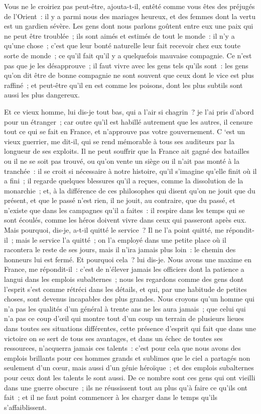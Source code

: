 \documentclass[french,twoside]{book} %
\begin{document}
Vous ne le croiriez pas peut-être, ajouta-t-il, entêté comme vous êtes des préjugés \\
de l’Orient : il y a parmi nous des mariages heureux, et des femmes dont la vertu est un gardien sévère. Les gens dont nous parlons goûtent entre eux une paix qui ne peut être troublée ; ils sont aimés et estimés de tout le monde : il n’y a qu’une chose ; c’est que leur bonté naturelle leur fait recevoir chez eux toute sorte de monde ; ce qu’il fait qu’il y a quelquefois mauvaise compagnie. Ce n’est pas que je les désapprouve ; il faut vivre avec les gens tels qu’ils sont : les gens qu’on dit être de bonne compagnie ne sont souvent que ceux dont le vice est plus raffiné ; et peut-être qu’il en est comme les poisons, dont les plus subtils sont aussi les plus dangereux.\par
Et ce vieux homme, lui dis-je tout bas, qui a l’air si chagrin ? je l’ai pris d’abord pour un étranger ; car outre qu’il est habillé autrement que les autres, il censure tout ce qui se fait en France, et n’approuve pas votre gouvernement. C ‘est un vieux guerrier, me dit-il, qui se rend mémorable à tous ses auditeurs par la longueur de ses exploits. Il ne peut souffrir que la France ait gagné des batailles ou il ne se soit pas trouvé, ou qu’on vente un siège ou il n’ait pas monté à la tranchée : il se croit si nécessaire à notre histoire, qu’il s’imagine qu’elle finit où il a fini ; il regarde quelques blessures qu’il a reçues, comme la dissolution de la monarchie ; et, à la différence de ces philosophes qui disent qu’on ne jouit que du présent, et que le passé n’est rien, il ne jouit, au contraire, que du passé, et n’existe que dans les campagnes qu’il a faites : il respire dans les temps qui se sont écoulés, comme les héros doivent vivre dans ceux qui passeront après eux. Mais pourquoi, dis-je, a-t-il quitté le service ? Il ne l’a point quitté, me répondit-il ; mais le service l’a quitté ; on l’a employé dans une petite place où il racontera le reste de ses jours, mais il n’ira jamais plus loin : le chemin des honneurs lui est fermé. Et pourquoi cela ? lui dis-je. Nous avons une maxime en France, me répondit-il : c’est de n’élever jamais les officiers dont la patience a langui dans les emplois subalternes ; nous les regardons comme des gens dont l’esprit s’est comme rétréci dans les détails, et qui, par une habitude de petites choses, sont devenus incapables des plus grandes. Nous croyons qu’un homme qui n’a pas les qualités d’un général à trente ans ne les aura jamais ; que celui qui n’a pas ce coup d’œil qui montre tout d’un coup un terrain de plusieurs lieues dans toutes ses situations différentes, cette présence d’esprit qui fait que dans une victoire on se sert de tous ses avantages, et dans un échec de toutes ses ressources, n’acquerra jamais ces talents : c’est pour cela que nous avons des emplois brillants pour ces hommes grands et sublimes que le ciel a partagés non seulement d’un cœur, mais aussi d’un génie héroïque ; et des emplois subalternes pour ceux dont les talents le sont aussi. De ce nombre sont ces gens qui ont vieilli dans une guerre obscure ; ils ne réussissent tout au plus qu’à faire ce qu’ils ont fait ; et il ne faut point commencer à les charger dans le temps qu’ils s’affaiblissent.\par
\end{document}
